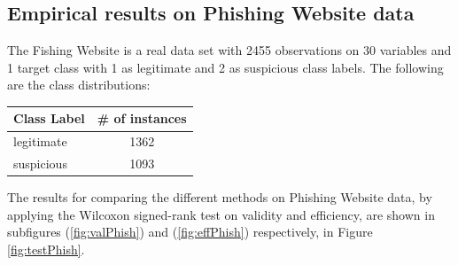 \documentclass[main]{subfiles}
\begin{document}
\subsection{Empirical results on Phishing Website data}
The Fishing Website is a real data set with 2455 observations  on 30 variables and 1 target class with 1 as legitimate and 2 as suspicious class labels.  The following are the class distributions:

\begin{center}

\begin{tabular}{l|c}
Class Label & \# of instances \\
\toprule
legitimate &  1362\\
suspicious &  1093\\
\end{tabular}
\end{center}

The results for comparing the different methods on Phishing Website data, by applying the Wilcoxon signed-rank test on validity and efficiency, are shown in subfigures (\ref{fig:valPhish}) and (\ref{fig:effPhish}) respectively, in Figure \ref{fig:testPhish}.
\end{document}
